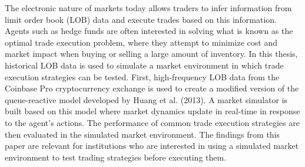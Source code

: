 The electronic nature of markets today allows traders to infer information from limit order book (LOB) data and execute trades based on this information. Agents such as hedge funds are often interested in solving what is known as the optimal trade execution problem, where they attempt to minimize cost and market impact when buying or selling a large amount of inventory. In this thesis, historical LOB data is used to simulate a market environment in which trade execution strategies can be tested. First, high-frequency LOB data from the Coinbase Pro cryptocurrency exchange is used to create a modified version of the queue-reactive model developed by Huang et al. (2013). A market simulator is built based on this model where market dynamics update in real-time in response to the agent's actions. The performance of common trade execution strategies are then evaluated in the simulated market environment. The findings from this paper are relevant for institutions who are interested in using a simulated market environment to test trading strategies before executing them.